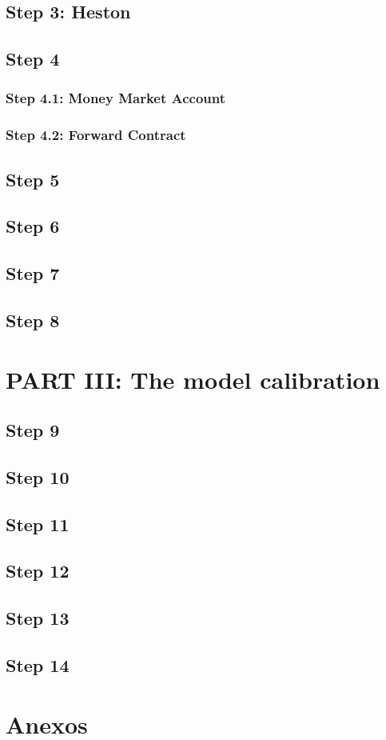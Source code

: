 \documentclass[12pt,a4paper]{article}
\begin{document}
\subsection{Step 3: Heston}

\subsection{Step 4}

\subsubsection{Step 4.1: Money Market Account}

\subsubsection{Step 4.2: Forward Contract}

\subsection{Step 5}

\subsection{Step 6}

\subsection{Step 7}

\subsection{Step 8}


\section{PART III: The model calibration}

\subsection{Step 9}

\subsection{Step 10}

\subsection{Step 11}

\subsection{Step 12}

\subsection{Step 13}

\subsection{Step 14}


\clearpage
\section{Anexos}



\clearpage
\end{document}

